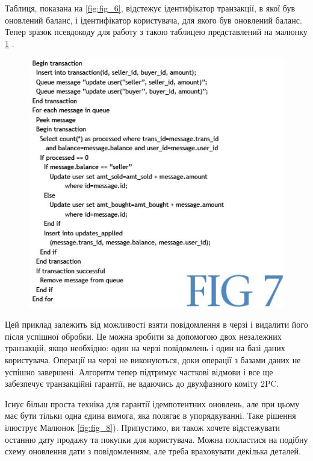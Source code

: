 \documentclass[14pt]{vakthesis}
\begin{document}
Таблиця, показана на \ref{fig:fig_6}, відстежує ідентифікатор транзакції, в якої був оновлений баланс, і ідентифікатор користувача, для якого був оновлений баланс. Тепер зразок псевдокоду для работу з такою таблицею представлений на малюнку \ref{fig:fig_7} .

\begin{figure}
\centering
\includegraphics[width=\linewidth]{images/fig7.jpg}
     \label{fig:fig_7}
\end{figure}

Цей приклад залежить від можливості взяти повідомлення в черзі і видалити його після успішної обробки. 
Це можна зробити за допомогою двох незалежних транзакцій, якщо необхідно: один на черзі повідомлень і один на базі даних користувача. 
Операції на черзі не виконуються, доки операції з базами даних не успішно завершені.
Алгоритм тепер підтримує часткові відмови і все ще забезпечує транзакційні гарантії, не вдаючись до двухфазного коміту 2PC.

Існує більш проста техніка для гарантії ідемпотентних оновлень, але при цьому має бути тільки одна єдина вимога, яка полягає в упорядкуванні. 
Таке рішення ілюструє Малюнок \ref{fig:fig_8}). 
Припустимо, ви також хочете відстежувати останню дату продажу та покупки для користувача. 
Можна покластися на подібну схему оновлення дати з повідомленням, але треба враховувати декілька деталей.
\end{document}
